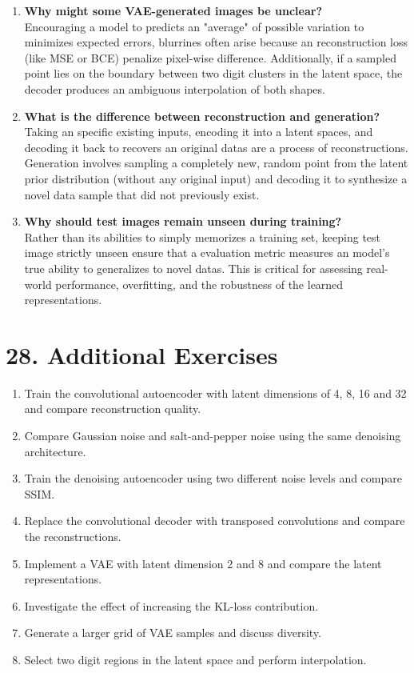 \documentclass[10pt]{article}
\begin{document}
\begin{enumerate}
\item \textbf{Why might some VAE-generated images be unclear?}\\
Encouraging a model to predicts an "average" of possible variation to minimizes expected errors, blurrines often arise because an reconstruction loss (like MSE or BCE) penalize pixel-wise difference. Additionally, if a sampled point lies on the boundary between two digit clusters in the latent space, the decoder produces an ambiguous interpolation of both shapes.

\item \textbf{What is the difference between reconstruction and generation?}\\
Taking an specific existing inputs, encoding it into a latent spaces, and decoding it back to recovers an original datas are a process of reconstructions. Generation involves sampling a completely new, random point from the latent prior distribution (without any original input) and decoding it to synthesize a novel data sample that did not previously exist.

\item \textbf{Why should test images remain unseen during training?}\\
Rather than its abilities to simply memorizes a training set, keeping test image strictly unseen ensure that a evaluation metric measures an model's true ability to generalizes to novel datas. This is critical for assessing real-world performance, overfitting, and the robustness of the learned representations.
\end{enumerate}

\section*{28. Additional Exercises}

\begin{enumerate}
\item Train the convolutional autoencoder with latent dimensions of 4, 8, 16
and 32 and compare reconstruction quality.
\item Compare Gaussian noise and salt-and-pepper noise using the same denoising
architecture.
\item Train the denoising autoencoder using two different noise levels and
compare SSIM.
\item Replace the convolutional decoder with transposed convolutions and
compare the reconstructions.
\item Implement a VAE with latent dimension 2 and 8 and compare the latent
representations.
\item Investigate the effect of increasing the KL-loss contribution.
\item Generate a larger grid of VAE samples and discuss diversity.
\item Select two digit regions in the latent space and perform interpolation.
\end{enumerate}
\end{document}
